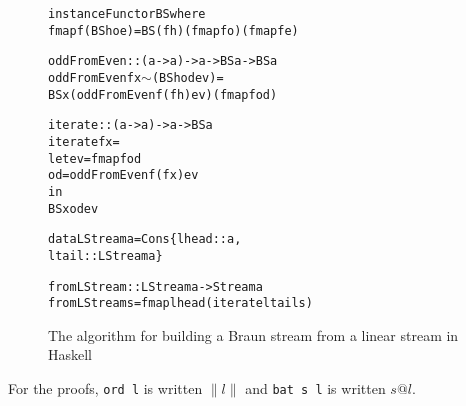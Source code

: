\documentclass[envcountsect]{llncs}
\newcommand{\ord}[1]{\|#1\|}
\begin{document}
\begin{figure}
\begin{alltt}
instance Functor BS where
    fmap f (BS h o e) = BS (f h) (fmap f o) (fmap f e)

oddFromEven :: (a -> a) -> a -> BS a -> BS a
oddFromEven f x  \(\sim\)(BS h od ev) =
    BS x (oddFromEven f (f h) ev) (fmap f od)

iterate :: (a -> a) -> a -> BS a
iterate f x =
    let ev = fmap f od
        od = oddFromEven f (f x) ev
    in
      BS x od ev

data LStream a = Cons \{lhead::a,
                       ltail::LStream a\}

fromLStream :: LStream a -> Stream a
fromLStream s = fmap lhead (iterate ltail s)
\end{alltt}
\caption{The algorithm for building a Braun stream from a linear stream in Haskell}
\label{iterateCode}
\end{figure}

For the proofs, \verb|ord l| is written $\ord{l}$ and \verb|bat s l| is written $s@l$.
\end{document}
